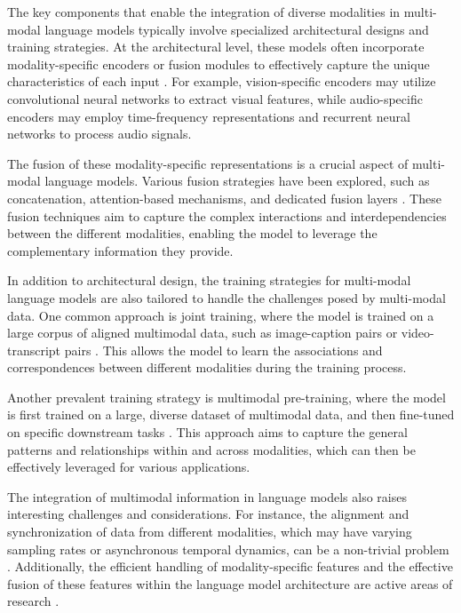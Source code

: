 \documentclass[11pt]{article}
\begin{document}
The key components that enable the integration of diverse modalities in multi-modal language models typically involve specialized architectural designs and training strategies. At the architectural level, these models often incorporate modality-specific encoders or fusion modules to effectively capture the unique characteristics of each input \cite{ref20,ref21}. For example, vision-specific encoders may utilize convolutional neural networks to extract visual features, while audio-specific encoders may employ time-frequency representations and recurrent neural networks to process audio signals.

The fusion of these modality-specific representations is a crucial aspect of multi-modal language models. Various fusion strategies have been explored, such as concatenation, attention-based mechanisms, and dedicated fusion layers \cite{ref16,ref22}. These fusion techniques aim to capture the complex interactions and interdependencies between the different modalities, enabling the model to leverage the complementary information they provide.

In addition to architectural design, the training strategies for multi-modal language models are also tailored to handle the challenges posed by multi-modal data. One common approach is joint training, where the model is trained on a large corpus of aligned multimodal data, such as image-caption pairs or video-transcript pairs \cite{ref23}. This allows the model to learn the associations and correspondences between different modalities during the training process.

Another prevalent training strategy is multimodal pre-training, where the model is first trained on a large, diverse dataset of multimodal data, and then fine-tuned on specific downstream tasks \cite{ref17,ref21}. This approach aims to capture the general patterns and relationships within and across modalities, which can then be effectively leveraged for various applications.

The integration of multimodal information in language models also raises interesting challenges and considerations. For instance, the alignment and synchronization of data from different modalities, which may have varying sampling rates or asynchronous temporal dynamics, can be a non-trivial problem \cite{ref24}. Additionally, the efficient handling of modality-specific features and the effective fusion of these features within the language model architecture are active areas of research \cite{ref25}.
\end{document}
